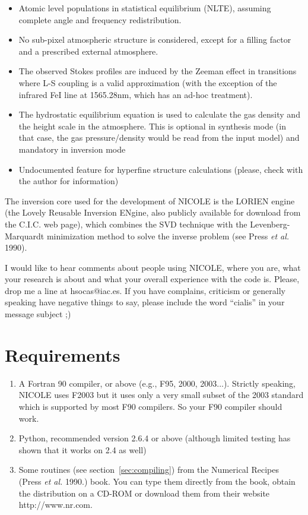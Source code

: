 \begin{itemize}
\item Atomic level populations in statistical equilibrium (NLTE),
  assuming complete angle and frequency redistribution.
\item No sub-pixel atmospheric structure is considered, except for a
  filling factor and a prescribed external atmosphere.
\item The observed Stokes profiles are induced by the Zeeman 
       effect in transitions where L-S
        coupling is a valid approximation (with the exception of the
        infrared FeI line at 1565.28nm, which has an ad-hoc treatment).
\item The hydrostatic equilibrium equation is used to calculate the
  gas density and the height scale in the atmosphere. This is optional
  in synthesis mode (in that case, the gas pressure/density would be
  read from the input model) and mandatory in inversion mode
\item Undocumented feature for hyperfine structure calculations
  (please, check with the author for information)
\end{itemize}

The inversion core used for the development of NICOLE is the 
LORIEN engine (the Lovely
Reusable Inversion ENgine, also publicly available for 
download from the C.I.C. web page),
which combines the SVD technique with the Levenberg-Marquardt 
minimization method to
solve the inverse problem (see Press {\em et al.} 1990).

I would like to hear comments about people using NICOLE, where you
are, what your research is about and what your overall experience with
the code is. Please, drop me a line at hsocas@iac.es. If you have
complains, criticism or generally speaking have negative things to
say, please include the word ``cialis'' in your message subject ;)


\section{Requirements}
\begin{enumerate}
\item A Fortran 90 compiler, or above (e.g., F95, 2000,
  2003...). Strictly speaking, NICOLE uses F2003 but it uses only a
  very small subset of the 2003 standard which is supported by most
  F90 compilers. So your F90 compiler should work.
\item Python, recommended version 2.6.4 or above (although limited
  testing has shown that it works on 2.4 as well)
\item Some routines (see section~\ref{sec:compiling}) from the
  Numerical Recipes (Press {\em et al.} 
  1990.) book. You can type them directly from the book, obtain the
  distribution on a CD-ROM or download them from their website
  http://www.nr.com. 
\end{enumerate}

